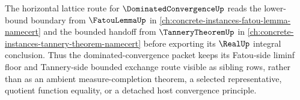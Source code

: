 The horizontal lattice route for $\DominatedConvergenceUp$ reads the lower-bound boundary from $\FatouLemmaUp$ in \autoref{ch:concrete-instances-fatou-lemma-namecert} and the bounded handoff from $\TanneryTheoremUp$ in \autoref{ch:concrete-instances-tannery-theorem-namecert} before exporting its $\RealUp$ integral conclusion. Thus the dominated-convergence packet keeps its Fatou-side liminf floor and Tannery-side bounded exchange route visible as sibling rows, rather than as an ambient measure-completion theorem, a selected representative, quotient function equality, or a detached host convergence principle.
